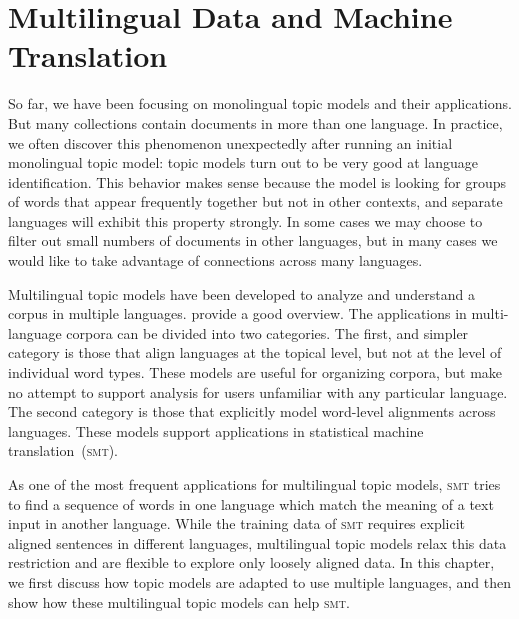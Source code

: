 \chapter{Multilingual Data and Machine Translation}
\label{ch:mt}

So far, we have been focusing on monolingual topic models and their applications.
But many collections contain documents in more than one language.
In practice, we often discover this phenomenon unexpectedly after running an initial monolingual topic model: topic models turn out to be very good at language identification.
This behavior makes sense because the model is looking for groups of words that appear frequently together but not in other contexts, and separate languages will exhibit this property strongly.
In some cases we may choose to filter out small numbers of documents in other languages, but in many cases we would like to take advantage of  connections across many languages.

Multilingual topic models have been developed to analyze and understand a corpus in multiple languages.
\citet{vulic2015probabilistic} provide a good overview.
The applications in multi-language corpora can be divided into two categories.
The first, and simpler category is those that align languages at the topical level, but not at the level of individual word types.
These models are useful for organizing corpora, but make no attempt to support analysis for users unfamiliar with any particular language.
The second category is those that explicitly model word-level alignments across languages.
These models support applications in statistical machine translation~(\textsc{smt}).

As one of the most frequent applications for multilingual topic models, \textsc{smt} tries
to find a sequence of words in one language  which match the meaning of a text input
in another language. While the training data of \textsc{smt} requires explicit aligned sentences
in different languages, multilingual topic models relax this data restriction and are flexible to 
explore only loosely aligned data.  In this chapter, we first discuss how topic models are 
adapted to use multiple languages, and then show how these multilingual topic models can 
help \textsc{smt}.

